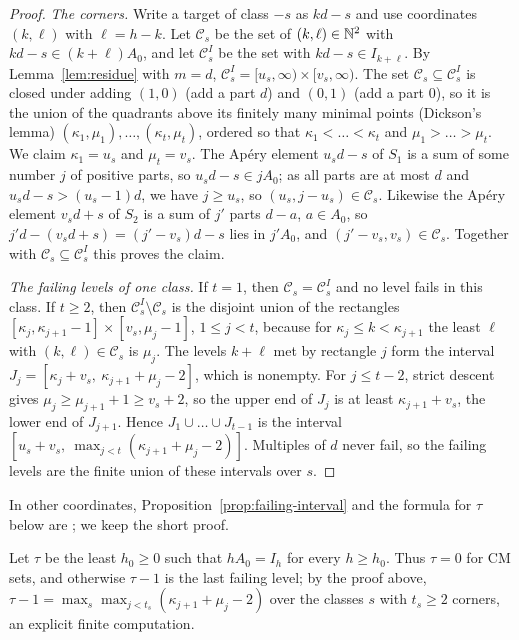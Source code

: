 \begin{proof}
\emph{The corners.} Write a target of class $-s$ as $kd-s$ and use coordinates $(k,\ell)$ with $\ell=h-k$. Let $\mathcal C_s$ be the set of $(k,\ell)\in\mathbb{N}^2$ with $kd-s\in(k+\ell)A_0$, and let $\mathcal C^I_s$ be the set with $kd-s\in I_{k+\ell}$. By Lemma~\ref{lem:residue} with $m=d$, $\mathcal C^I_s=[u_s,\infty)\times[v_s,\infty)$. The set $\mathcal C_s\subseteq\mathcal C^I_s$ is closed under adding $(1,0)$ (add a part $d$) and $(0,1)$ (add a part $0$), so it is the union of the quadrants above its finitely many minimal points (Dickson's lemma) $(\kappa_1,\mu_1),\dots,(\kappa_t,\mu_t)$, ordered so that $\kappa_1<\dots<\kappa_t$ and $\mu_1>\dots>\mu_t$. We claim $\kappa_1=u_s$ and $\mu_t=v_s$. The Ap\'ery element $u_sd-s$ of $S_1$ is a sum of some number $j$ of positive parts, so $u_sd-s\in jA_0$; as all parts are at most $d$ and $u_sd-s>(u_s-1)d$, we have $j\ge u_s$, so $(u_s,j-u_s)\in\mathcal C_s$. Likewise the Ap\'ery element $v_sd+s$ of $S_2$ is a sum of $j'$ parts $d-a$, $a\in A_0$, so $j'd-(v_sd+s)=(j'-v_s)d-s$ lies in $j'A_0$, and $(j'-v_s,v_s)\in\mathcal C_s$. Together with $\mathcal C_s\subseteq\mathcal C^I_s$ this proves the claim.

\emph{The failing levels of one class.} If $t=1$, then $\mathcal C_s=\mathcal C^I_s$ and no level fails in this class. If $t\ge2$, then $\mathcal C^I_s\setminus\mathcal C_s$ is the disjoint union of the rectangles $[\kappa_j,\kappa_{j+1}-1]\times[v_s,\mu_j-1]$, $1\le j<t$, because for $\kappa_j\le k<\kappa_{j+1}$ the least $\ell$ with $(k,\ell)\in\mathcal C_s$ is $\mu_j$. The levels $k+\ell$ met by rectangle $j$ form the interval $J_j=[\kappa_j+v_s,\ \kappa_{j+1}+\mu_j-2]$, which is nonempty. For $j\le t-2$, strict descent gives $\mu_j\ge\mu_{j+1}+1\ge v_s+2$, so the upper end of $J_j$ is at least $\kappa_{j+1}+v_s$, the lower end of $J_{j+1}$. Hence $J_1\cup\dots\cup J_{t-1}$ is the interval $[u_s+v_s,\ \max_{j<t}(\kappa_{j+1}+\mu_j-2)]$. Multiples of $d$ never fail, so the failing levels are the finite union of these intervals over $s$.
\end{proof}

In other coordinates, Proposition~\ref{prop:failing-interval} and the formula for $\tau$ below are \cite[Lemma~2.5]{CompanionRegularity}; we keep the short proof.

Let $\tau$ be the least $h_0\ge0$ such that $hA_0=I_h$ for every $h\ge h_0$. Thus $\tau=0$ for CM sets, and otherwise $\tau-1$ is the last failing level; by the proof above, $\tau-1=\max_s\max_{j<t_s}(\kappa_{j+1}+\mu_j-2)$ over the classes $s$ with $t_s\ge2$ corners, an explicit finite computation.

